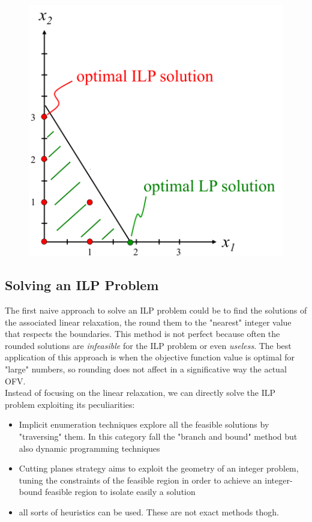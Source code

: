 \documentclass{article}
\begin{document}
			\begin{minipage}{0.5\linewidth}
				\begin{figure}[H]
					\centering
					\includegraphics[width = \textwidth]{./images/ILP1.png}
				\end{figure}
			\end{minipage}

		\subsection{Solving an ILP Problem}
			The first naive approach to solve an ILP problem could be to find the solutions of the associated linear relaxation, the round them to the "nearest" integer value that respects the boundaries. This method is not perfect because often the rounded solutions are \textit{infeasible} for the ILP problem or even \textit{useless}. The best application of this approach is when the objective function value is optimal for "large" numbers, so rounding does not affect in a significative way the actual OFV.\\
			Instead of focusing on the linear relaxation, we can directly solve the ILP problem exploiting its peculiarities:
			\begin{itemize}
				\item Implicit enumeration techniques explore all the feasible solutions by "traversing" them. In this category fall the "branch and bound" method but also dynamic programming techniques
				\item Cutting planes strategy aims to exploit the geometry of an integer problem, tuning the constraints of the feasible region in order to achieve an integer-bound feasible region to isolate easily a solution
				\item all sorts of heuristics can be used. These are not exact methods thogh.
			\end{itemize}
\end{document}
